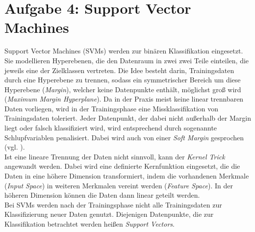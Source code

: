 \section{Aufgabe 4: Support Vector Machines}
Support Vector Machines (SVMs) werden zur binären Klassifikation eingesetzt. Sie modellieren Hyperebenen, die den Datenraum in zwei zwei Teile einteilen, die jeweils eine der Zielklassen vertreten. Die Idee besteht darin, Trainingsdaten durch eine Hyperebene zu trennen, sodass ein symmetrischer Bereich um diese Hyperebene (\emph{Margin}), welcher keine Datenpunkte enthält, möglichst groß wird (\emph{Maximum Margin Hyperplane}). Da in der Praxis meist keine linear trennbaren Daten vorliegen, wird in der Trainingsphase eine Missklassifikation von Trainingsdaten toleriert. Jeder Datenpunkt, der dabei nicht außerhalb der Margin liegt oder falsch klassifiziert wird, wird entsprechend durch sogenannte Schlupfvariablen penalisiert. Dabei wird auch von einer \emph{Soft Margin} gesprochen (vgl. \cite{2015_aggarwal}).\\
\noindent \hspace*{7mm}
Ist eine lineare Trennung der Daten nicht sinnvoll, kann der \emph{Kernel Trick} angewandt werden. Dabei wird eine definierte Kernfunktion eingesetzt, die die Daten in eine höhere Dimension transformiert, indem die vorhandenen Merkmale (\emph{Input Space}) in weiteren Merkmalen vereint werden (\emph{Feature Space}). In der höheren Dimension können die Daten dann linear geteilt werden.\\
\noindent \hspace*{7mm}
Bei SVMs werden nach der Trainingsphase nicht alle Trainingsdaten zur Klassifizierung neuer Daten genutzt. Diejenigen Datenpunkte, die zur Klassifikation betrachtet werden heißen \emph{Support Vectors}.
